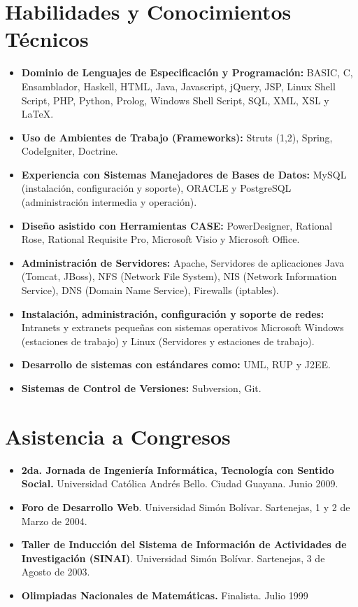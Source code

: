 \documentclass[letterpaper,11pt]{report}
\begin{document}
\section*{Habilidades y Conocimientos Técnicos}
\begin{itemize}
\item
\textbf{Dominio de Lenguajes de Especificación y Programación:} BASIC, C, Ensamblador, Haskell, HTML, Java, Javascript, jQuery, JSP, Linux Shell Script, PHP, Python, Prolog, Windows Shell Script, SQL, XML, XSL y LaTeX.
\item
\textbf{Uso de Ambientes de Trabajo (Frameworks):} Struts (1,2), Spring, CodeIgniter, Doctrine.
\item
\textbf{Experiencia con Sistemas Manejadores de Bases de Datos:} MySQL (instalación, configuración y soporte), ORACLE y PostgreSQL (administración intermedia y operación).
\item
\textbf{Dise\~{n}o asistido con Herramientas CASE:} PowerDesigner, Rational Rose, Rational Requisite Pro, Microsoft Visio y Microsoft Office.
\item
\textbf{Administración de Servidores:} Apache, Servidores de aplicaciones Java (Tomcat, JBoss), NFS (Network File System), NIS (Network Information Service), DNS (Domain Name Service), Firewalls (iptables).
\item
\textbf{Instalación, administración, configuración y soporte de redes:} Intranets y extranets peque\~{n}as con sistemas operativos Microsoft Windows (estaciones de trabajo) y Linux (Servidores y estaciones de trabajo).
\item
\textbf{Desarrollo de sistemas con estándares como:} UML, RUP y J2EE.
\item
\textbf{Sistemas de Control de Versiones:} Subversion, Git.
\end{itemize}

\section*{Asistencia a Congresos}
\begin{itemize}
\item
\textbf{2da. Jornada de Ingeniería Informática, Tecnología con Sentido Social.} Universidad Católica Andrés Bello. Ciudad Guayana. Junio 2009.
\item
\textbf{Foro de Desarrollo Web}. Universidad Simón Bolívar. Sartenejas, 1 y 2 de Marzo de 2004.
\item
\textbf{Taller de Inducción del Sistema de Información de Actividades de Investigación (SINAI)}. Universidad Simón Bolívar. Sartenejas, 3 de Agosto de 2003.
\item
\textbf{Olimpiadas Nacionales de Matemáticas.} Finalista. Julio 1999
\end{itemize}
\end{document}
